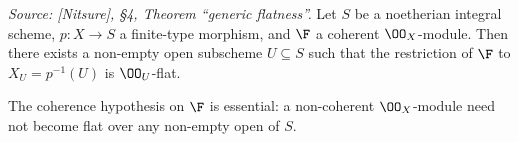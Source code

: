 \begin{theorem}



  \label{thm:generic_flatness}
  \textit{Source: [Nitsure], \S4, Theorem ``generic flatness''.}
  Let \(S\) be a noetherian integral scheme, \(p : X \to S\) a finite-type morphism,
  and \(\F\) a coherent \(\OO_X\)-module. Then there exists a non-empty open
  subscheme \(U \subseteq S\) such that the restriction of \(\F\) to
  \(X_U = p^{-1}(U)\) is \(\OO_U\)-flat.

  The coherence hypothesis on \(\F\) is essential: a non-coherent \(\OO_X\)-module
  need not become flat over any non-empty open of \(S\).
\end{theorem}

